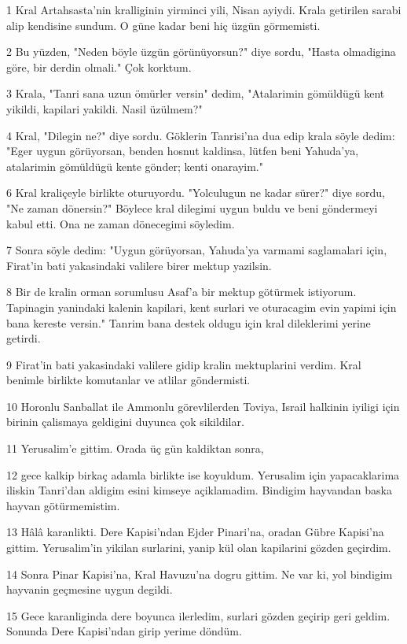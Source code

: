 \par 1 Kral Artahsasta'nin kralliginin yirminci yili, Nisan ayiydi. Krala getirilen sarabi alip kendisine sundum. O güne kadar beni hiç üzgün görmemisti.
\par 2 Bu yüzden, "Neden böyle üzgün görünüyorsun?" diye sordu, "Hasta olmadigina göre, bir derdin olmali." Çok korktum.
\par 3 Krala, "Tanri sana uzun ömürler versin" dedim, "Atalarimin gömüldügü kent yikildi, kapilari yakildi. Nasil üzülmem?"
\par 4 Kral, "Dilegin ne?" diye sordu. Göklerin Tanrisi'na dua edip krala söyle dedim: "Eger uygun görüyorsan, benden hosnut kaldinsa, lütfen beni Yahuda'ya, atalarimin gömüldügü kente gönder; kenti onarayim."
\par 6 Kral kraliçeyle birlikte oturuyordu. "Yolculugun ne kadar sürer?" diye sordu, "Ne zaman dönersin?" Böylece kral dilegimi uygun buldu ve beni göndermeyi kabul etti. Ona ne zaman dönecegimi söyledim.
\par 7 Sonra söyle dedim: "Uygun görüyorsan, Yahuda'ya varmami saglamalari için, Firat'in bati yakasindaki valilere birer mektup yazilsin.
\par 8 Bir de kralin orman sorumlusu Asaf'a bir mektup götürmek istiyorum. Tapinagin yanindaki kalenin kapilari, kent surlari ve oturacagim evin yapimi için bana kereste versin." Tanrim bana destek oldugu için kral dileklerimi yerine getirdi.
\par 9 Firat'in bati yakasindaki valilere gidip kralin mektuplarini verdim. Kral benimle birlikte komutanlar ve atlilar göndermisti.
\par 10 Horonlu Sanballat ile Ammonlu görevlilerden Toviya, Israil halkinin iyiligi için birinin çalismaya geldigini duyunca çok sikildilar.
\par 11 Yerusalim'e gittim. Orada üç gün kaldiktan sonra,
\par 12 gece kalkip birkaç adamla birlikte ise koyuldum. Yerusalim için yapacaklarima iliskin Tanri'dan aldigim esini kimseye açiklamadim. Bindigim hayvandan baska hayvan götürmemistim.
\par 13 Hâlâ karanlikti. Dere Kapisi'ndan Ejder Pinari'na, oradan Gübre Kapisi'na gittim. Yerusalim'in yikilan surlarini, yanip kül olan kapilarini gözden geçirdim.
\par 14 Sonra Pinar Kapisi'na, Kral Havuzu'na dogru gittim. Ne var ki, yol bindigim hayvanin geçmesine uygun degildi.
\par 15 Gece karanliginda dere boyunca ilerledim, surlari gözden geçirip geri geldim. Sonunda Dere Kapisi'ndan girip yerime döndüm.
